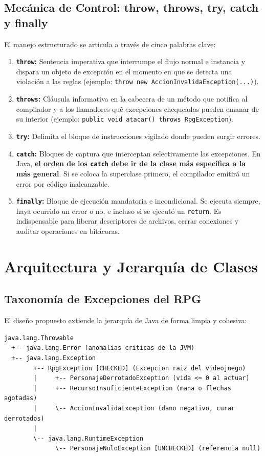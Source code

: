 \documentclass[11pt,letterpaper]{article}
\begin{document}
\subsection{Mecánica de Control: throw, throws, try, catch y finally}
El manejo estructurado se articula a través de cinco palabras clave:
\begin{enumerate}
    \item \textbf{\texttt{throw}:} Sentencia imperativa que interrumpe el flujo normal e instancia y dispara un objeto de excepción en el momento en que se detecta una violación a las reglas (ejemplo: \texttt{throw new AccionInvalidaException(...)}).
    \item \textbf{\texttt{throws}:} Cláusula informativa en la cabecera de un método que notifica al compilador y a los llamadores qué excepciones chequeadas pueden emanar de su interior (ejemplo: \texttt{public void atacar() throws RpgException}).
    \item \textbf{\texttt{try}:} Delimita el bloque de instrucciones vigilado donde pueden surgir errores.
    \item \textbf{\texttt{catch}:} Bloques de captura que interceptan selectivamente las excepciones. En Java, \textbf{el orden de los \texttt{catch} debe ir de la clase más específica a la más general}. Si se coloca la superclase primero, el compilador emitirá un error por código inalcanzable.
    \item \textbf{\texttt{finally}:} Bloque de ejecución mandatoria e incondicional. Se ejecuta siempre, haya ocurrido un error o no, e incluso si se ejecutó un \texttt{return}. Es indispensable para liberar descriptores de archivos, cerrar conexiones y auditar operaciones en bitácoras.
\end{enumerate}

\section{Arquitectura y Jerarquía de Clases}

\subsection{Taxonomía de Excepciones del RPG}
El diseño propuesto extiende la jerarquía de Java de forma limpia y cohesiva:

\begin{lstlisting}[style=TerminalStyle]
java.lang.Throwable
  +-- java.lang.Error (anomalias criticas de la JVM)
  +-- java.lang.Exception
        +-- RpgException [CHECKED] (Excepcion raiz del videojuego)
        |     +-- PersonajeDerrotadoException (vida <= 0 al actuar)
        |     +-- RecursoInsuficienteException (mana o flechas agotadas)
        |     \-- AccionInvalidaException (dano negativo, curar derrotados)
        |
        \-- java.lang.RuntimeException
              \-- PersonajeNuloException [UNCHECKED] (referencia null)
\end{lstlisting}
\end{document}
